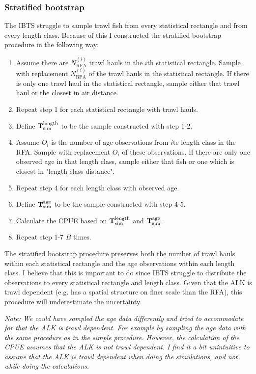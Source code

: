 \documentclass[a4paper 12pt]{article}
\numberwithin{equation}{section}
\begin{document}
\subsubsection{Stratified bootstrap}
\label{stratboot}
The IBTS struggle to sample trawl fish from every statistical rectangle and from every length class. Because of this I constructed the stratified bootstrap procedure in the following way: 

\begin{enumerate}
\item Assume there are $N_{\text{RFA}}^{(i)}$ trawl hauls in the $i$th statistical rectangle.  Sample with replacement $N_{\text{RFA}}^{(i)}$ of the trawl hauls in the statistical rectangle. If there is only one trawl haul in the statistical rectangle, sample either that trawl haul or the closest in air distance. 
\item Repeat step 1 for each statistical rectangle with trawl hauls. 
\item Define ${\bf T}_{\text{sim}}^{\text{length}}$ to be the sample constructed with step 1-2.
\item Assume $O_i$ is the number of age observations from $i$te length class in the RFA. Sample with replacement $O_i$ of these observations. If there are only one observed age in that length class, sample either that fish or one which is closest in "length class distance".
\item Repeat step 4 for each length class with observed age. 
\item Define ${\bf T}_{\text{sim}}^{\text{age}}$ to be the sample constructed with step 4-5.
\item Calculate the CPUE based on ${\bf T }_{\text{sim}}^{\text{length}}$ and ${\bf T}_{\text{sim}}^{\text{age}}$. 
\item Repeat step 1-7 $B$ times.
\end{enumerate}  

The stratified bootstrap procedure preserves both the number of trawl hauls within each statistical rectangle and the age observations within each length class. I believe that this is important to do since IBTS struggle to distribute the observations to every statistical rectangle and length class. Given that the ALK is trawl dependent (e.g. has a spatial structure on finer scale than the RFA), this procedure will underestimate the uncertainty. 

\textit{Note: We could have sampled the age data differently and tried to accommodate for that the ALK is trawl dependent. For example by sampling the age data with the same procedure as in the simple procedure. However, the calculation of the CPUE assumes that the ALK is not trawl dependent. I find it a bit unintuitive to assume that the ALK is trawl dependent when doing the simulations, and not while doing the calculations.} 
\end{document}
